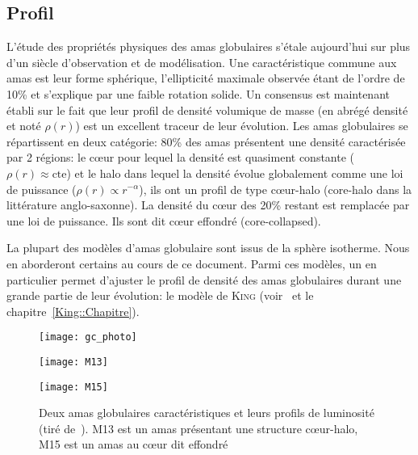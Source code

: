 		\subsection{Profil}

			L'étude des propriétés physiques des amas globulaires s'étale aujourd'hui
			sur plus d'un siècle d'observation et de modélisation. Une caractéristique
			commune aux amas est leur forme sphérique, l'ellipticité maximale observée
			étant de l'ordre de 10\% et s'explique par une faible rotation solide. Un
			consensus est maintenant établi sur le fait que leur profil de densité
			volumique de masse (en abrégé densité et noté $\rho(r)$) est un excellent
			traceur de leur évolution. Les amas globulaires se répartissent en deux
			catégorie: 80\% des amas présentent une densité caractérisée par 2 régions:
			le cœur pour lequel la densité est quasiment constante ($\rho(r) \approx
			\mathrm{cte}$) et le halo dans lequel la densité évolue globalement comme
			une loi de puissance ($\rho(r) \propto r^{-\alpha}$), ils ont un profil de
			type cœur-halo (core-halo dans la littérature anglo-saxonne). La densité du
			cœur des 20\% restant est remplacée par une loi de puissance. Ils sont dit
			cœur effondré (core-collapsed).

			La plupart des modèles d'amas globulaire sont issus de la sphère isotherme. Nous en
			aborderont certains au cours de ce document. Parmi ces modèles, un en particulier
			permet d'ajuster le profil de densité des amas globulaires durant une grande
			partie de leur évolution: le modèle de \textsc{King}
			(voir~\cite{1966AJ.....71...64K} et le chapitre~\ref{King::Chapitre}).

			\begin{figure}[h]
				\begin{center}
					\texttt{[image: gc\_photo]}
				\end{center}
				\begin{minipage}{0.45\textwidth}
					\begin{center}
						\texttt{[image: M13]}
					\end{center}
				\end{minipage}\hfill
				\begin{minipage}{0.45\textwidth}
					\begin{center}
						\texttt{[image: M15]}
					\end{center}
				\end{minipage}
				\caption{\label{Fig::Intro::images}Deux amas globulaires
					caractéristiques et leurs profils de luminosité (tiré de~\cite{2010A&A...522A..71J}).
					M13 est un amas présentant une structure cœur-halo,
					M15 est un amas au cœur dit effondré}
			\end{figure}

